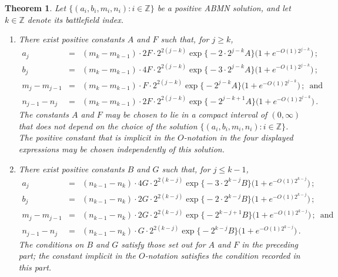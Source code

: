 \documentclass[letterpaper,11pt,oneside,reqno]{amsbook}
\newcommand{\Z}{\ensuremath{\mathbb{Z}}}
\newtheorem{theorem}{Theorem}[chapter]
\numberwithin{figure}{chapter}
\theoremstyle{definition}
\theoremstyle{definition}
\theoremstyle{definition}
\theoremstyle{definition}
\theoremstyle{definition}
\newcommand{\abmnmacspace}{\textrm{ABMN} }
\begin{document}
\begin{theorem}\label{t.ajbj}
Let $\big\{ (a_i,b_i,m_i,n_i): i \in \Z \big\}$ be a positive  \abmnmacspace solution, and let $k \in \Z$ denote its battlefield index.
\begin{enumerate}
\item There exist positive constants $A$ and $F$ such that,
for $j \geq k$, 
\begin{eqnarray*}
a_j & = & (m_k - m_{k-1})\cdot 2F \cdot  2^{2(j-k)} \exp \big\{ - 2 \cdot 2^{j-k}A     \big\}   \big( 1 + e^{-O(1) 2^{j-k}}\big) \, ; \\
b_j & = & (m_k - m_{k-1})\cdot 4F \cdot  2^{2(j-k)} \exp \big\{ - 3 \cdot 2^{j-k}A     \big\}   \big( 1 + e^{-O(1) 2^{j-k}}\big) \, ; \\
 m_j - m_{j-1} & = & (m_k - m_{k-1})\cdot F \cdot  2^{2(j-k)} \exp \big\{ - 2^{j-k}A     \big\}   \big( 1 + e^{-O(1) 2^{j-k}}\big) \, ; \, \, \,
 \textrm{and} \\
 n_{j-1} - n_j & = & (m_k - m_{k-1})\cdot 2F \cdot  2^{2(j-k)} \exp \big\{ - 2^{j-k+1}A      \big\}   \big( 1 + e^{-O(1) 2^{j-k}}\big) \, .
 \end{eqnarray*}
 The constants $A$ and $F$ may be chosen to lie in a compact interval of $(0,\infty)$ that does not depend on the choice of the solution  $\big\{ (a_i,b_i,m_i,n_i): i \in \Z \big\}$.
 The positive constant that is implicit in the $O$-notation in the four displayed expressions may be chosen independently of this solution.
\item There exist positive constants $B$ and $G$ such that,
 for $j \leq k-1$, 
\begin{eqnarray*}
a_j & = & (n_{k-1} - n_k)\cdot 4G \cdot  2^{2(k-j)} \exp \big\{ - 3 \cdot 2^{k-j}B     \big\}   \big( 1 + e^{-O(1) 2^{k-j}}\big) \, ; \\
b_j & = &  (n_{k-1} - n_k)\cdot 2G \cdot  2^{2(k-j)} \exp \big\{ - 2 \cdot 2^{k-j}B     \big\}   \big( 1 + e^{-O(1) 2^{k-j}}\big) \, ; \\
 m_j - m_{j-1} & = &  (n_{k-1} - n_k)\cdot 2G \cdot  2^{2(k-j)} \exp \big\{ - 2^{k-j+1}B     \big\}   \big( 1 + e^{-O(1) 2^{k-j}}\big) \, ; \, \, \,
 \textrm{and} \\
 n_{j-1} - n_j & = &  (n_{k-1} - n_k)\cdot G \cdot  2^{2(k-j)} \exp \big\{ - 2^{k-j}B      \big\}   \big( 1 + e^{-O(1) 2^{k-j}}\big) \, .
 \end{eqnarray*}
 The conditions on $B$ and $G$ satisfy those set out for $A$ and $F$ in the preceding part; the constant implicit in the $O$-notation satisfies the condition recorded in this part.
 \end{enumerate}
 \end{theorem}
\end{document}
